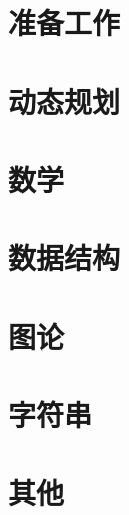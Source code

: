 \documentclass[12pt,openany,oneside]{book}
\begin{document}
\begin{CJK*}{UTF8}{song}                   %
\frontmatter                               %

\clearpage{\pagestyle{empty}\cleardoublepage}
\tableofcontents                           %

\mainmatter{}\sloppy\raggedbottom

\chapter{准备工作}





\chapter{动态规划}


\chapter{数学}




\chapter{数据结构}










\chapter{图论}





\chapter{字符串}


\chapter{其他}












\end{CJK*}                                        %
\end{document}
